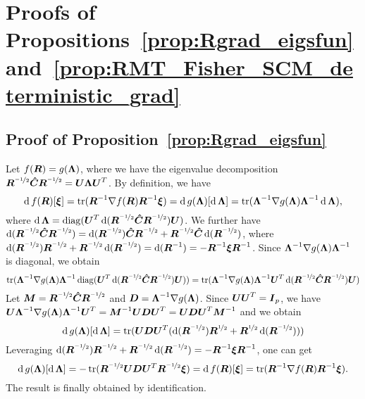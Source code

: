 \section{Proofs of Propositions~\ref{prop:Rgrad_eigsfun} and~\ref{prop:RMT_Fisher_SCM_deterministic_grad}}
\label{app:proofs}

\subsection{Proof of Proposition~\ref{prop:Rgrad_eigsfun}}

Let $f(\point) = g(\eigsMat)$, where we have the eigenvalue decomposition $\point^{\nicefrac{-1}2}\SCM\point^{\nicefrac{-1}2}=\MAT{U}\eigsMat\MAT{U}^T$.
By definition, we have
$$
    \diff f(\point)[\tangentVector] = \tr(\point^{-1}\grad f(\point)\point^{-1}\tangentVector)
    = \diff g(\eigsMat)[\diff\eigsMat] = \tr(\eigsMat^{-1}\grad g(\eigsMat)\eigsMat^{-1}\diff\eigsMat),
$$
where $\diff\eigsMat=\diag(\MAT{U}^T\diff(\point^{\nicefrac{-1}2}\SCM\point^{\nicefrac{-1}2})\MAT{U})$.
We further have
$\diff(\point^{\nicefrac{-1}2}\SCM\point^{\nicefrac{-1}2})=\diff(\point^{\nicefrac{-1}2})\SCM\point^{\nicefrac{-1}2} + \point^{\nicefrac{-1}2}\SCM\diff(\point^{\nicefrac{-1}2})$,
where
$\diff(\point^{\nicefrac{-1}2})\point^{\nicefrac{-1}2} + \point^{\nicefrac{-1}2}\diff(\point^{\nicefrac{-1}2}) = \diff(\point^{-1})=-\point^{-1}\tangentVector\point^{-1}$.
Since $\eigsMat^{-1}\grad g(\eigsMat)\eigsMat^{-1}$ is diagonal, we obtain
$$
     \tr(\eigsMat^{-1}\grad g(\eigsMat)\eigsMat^{-1}\diag(\MAT{U}^T\diff(\point^{\nicefrac{-1}2}\SCM\point^{\nicefrac{-1}2})\MAT{U}))
     =
     \tr(\eigsMat^{-1}\grad g(\eigsMat)\eigsMat^{-1}\MAT{U}^T\diff(\point^{\nicefrac{-1}2}\SCM\point^{\nicefrac{-1}2})\MAT{U})
$$
Let $\MAT{M}=\point^{\nicefrac{-1}2}\SCM\point^{\nicefrac{-1}2}$ and $\MAT{D} = \eigsMat^{-1}\grad g(\eigsMat)$.
Since $\MAT{U}\MAT{U}^T=\eye$, we have $\MAT{U}\eigsMat^{-1}\grad g(\eigsMat)\eigsMat^{-1}\MAT{U}^T=\MAT{M}^{-1}\MAT{U}\MAT{D}\MAT{U}^T=\MAT{U}\MAT{D}\MAT{U}^T\MAT{M}^{-1}$ and we obtain
$$
    \diff g(\eigsMat)[\diff\eigsMat] =
    \tr(\MAT{U}\MAT{D}\MAT{U}^T(\diff(\point^{\nicefrac{-1}2})\point^{\nicefrac12} + \point^{\nicefrac12}\diff(\point^{\nicefrac{-1}2})))
$$
Leveraging $\diff(\point^{\nicefrac{-1}2})\point^{\nicefrac{-1}2} + \point^{\nicefrac{-1}2}\diff(\point^{\nicefrac{-1}2}) = -\point^{-1}\tangentVector\point^{-1}$, one can get
$$
    \diff g(\eigsMat)[\diff\eigsMat] = -\tr(\point^{\nicefrac{-1}2}\MAT{U}\MAT{D}\MAT{U}^T\point^{\nicefrac{-1}2}\tangentVector) = \diff f(\point)[\tangentVector] = \tr(\point^{-1}\grad f(\point)\point^{-1}\tangentVector).
$$
The result is finally obtained by identification.



